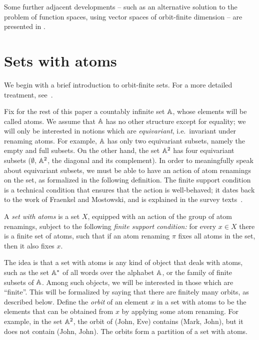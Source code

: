 \documentclass[a4paper,UKenglish,cleveref, autoref, numberwithinsect, thm-restate]{lipics-v2021}
\begin{document}
Some further adjacent developments -- such as an alternative solution to the problem of function spaces, using vector spaces of orbit-finite dimension -- are presented in .

\section{Sets with atoms}
We begin  with  a brief introduction to orbit-finite sets. For a more detailed treatment, see~\cite{bojanczyk_slightly2018}.

Fix for the rest of this paper a countably infinite set $\mathbb A$, whose elements will be called atoms.  We assume that $\mathbb A$ has no other structure except for equality; we will only be interested in notions which are \emph{equivariant}, i.e.~invariant under renaming atoms. For example, $\mathbb A$ has only two equivariant subsets, namely the empty and full subsets. On the other hand, the set $\mathbb A^2$ has four equivariant subsets ($\emptyset$, $\mathbb A^2$, the diagonal and its complement). In order to meaningfully speak about equivariant subsets, we must be able to have an action of atom renamings on the set, as formalized in the following definition. The finite support condition is a technical condition that ensures that the action is well-behaved; it dates back to the work of Fraenkel and Mostowski, and is explained in the survey texts~\cite{PittsAM:nomsns,bojanczyk_slightly2018}.

\begin{definition}
    A \emph{set with atoms} is a set $X$, equipped with an action of the group of atom renamings, subject to the following \emph{finite support condition:} for every $x \in X$ there is a finite set of atoms, such that if an atom renaming $\pi$ fixes all atoms in the set, then it also fixes $x$.
\end{definition}

The idea is that a set with atoms is any kind of object that deals with atoms, such as the set $\mathbb A^*$ of all words over the alphabet $\mathbb A$, or the family of finite subsets of $\mathbb A$. Among such objects, we will be interested in those which are ``finite''. This will be formalized by  saying that there are  finitely many orbits, as described below.
Define the \emph{orbit} of an element $x$ in a set with atoms to be the elements that can be obtained from $x$ by applying some atom renaming. For example, in the set $\mathbb A^2$,  the orbit of (John, Eve)   contains  (Mark, John), but it does not contain (John, John). The orbits form a partition of a set with atoms. 
\end{document}

